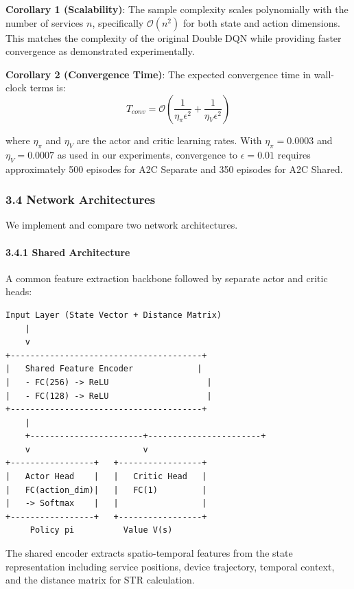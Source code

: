 \textbf{Corollary 1 (Scalability)}: The sample complexity scales
polynomially with the number of services \(n\), specifically
\(\mathcal{O}(n^2)\) for both state and action dimensions. This matches
the complexity of the original Double DQN while providing faster
convergence as demonstrated experimentally.

\textbf{Corollary 2 (Convergence Time)}: The expected convergence time
in wall-clock terms is:
\[T_{conv} = \mathcal{O}\left(\frac{1}{\eta_\pi \epsilon^2} + \frac{1}{\eta_V \epsilon^2}\right)\]

where \(\eta_\pi\) and \(\eta_V\) are the actor and critic learning
rates. With \(\eta_\pi = 0.0003\) and \(\eta_V = 0.0007\) as used in our
experiments, convergence to \(\epsilon = 0.01\) requires approximately
500 episodes for A2C Separate and 350 episodes for A2C Shared.

\hypertarget{network-architectures}{%
	\subsubsection{3.4 Network Architectures}\label{network-architectures}}

We implement and compare two network architectures.

\hypertarget{shared-architecture}{%
	\paragraph{3.4.1 Shared Architecture}\label{shared-architecture}}

A common feature extraction backbone followed by separate actor and
critic heads:

\begin{verbatim}
Input Layer (State Vector + Distance Matrix)
    |
    v
+---------------------------------------+
|   Shared Feature Encoder             |
|   - FC(256) -> ReLU                    |
|   - FC(128) -> ReLU                    |
+---------------------------------------+
    |
    +-----------------------+-----------------------+
    v                       v
+-----------------+   +-----------------+
|   Actor Head    |   |   Critic Head   |
|   FC(action_dim)|   |   FC(1)         |
|   -> Softmax    |   |                 |
+-----------------+   +-----------------+
     Policy pi          Value V(s)
\end{verbatim}

The shared encoder extracts spatio-temporal features from the state
representation including service positions, device trajectory, temporal
context, and the distance matrix for STR calculation.

